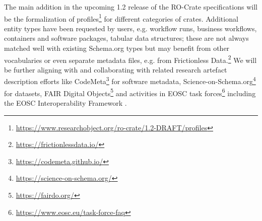 \documentclass[ds,v1.1.2,openaccess]{iosart2x}%
\begin{document}
The main addition in the upcoming 1.2 release of the RO-Crate
specifications will be the formalization of
profiles\footnote{\url{https://www.researchobject.org/ro-crate/1.2-DRAFT/profiles}}
for different categories of crates. Additional entity types have been
requested by users, e.g. workflow runs, business workflows, containers
and software packages, tabular data structures; these are not always
matched well with existing Schema.org types but may benefit from other
vocabularies or even separate metadata files, e.g. from Frictionless
Data.\footnote{\url{https://frictionlessdata.io/}} We will be further aligning with
and collaborating with related research artefact description efforts
like CodeMeta\footnote{\url{https://codemeta.github.io/}} for software metadata,
Science-on-Schema.org\footnote{\url{https://science-on-schema.org/}}
\cite{doi:10.5281/zenodo.4477164} for datasets, FAIR Digital
Objects\footnote{\url{https://fairdo.org/}} \cite{doi:10.3390/publications8020021} and
activities in EOSC task forces\footnote{\url{https://www.eosc.eu/task-force-faq}}
including the EOSC Interoperability Framework \cite{doi:10.2777/620649}.



\end{document}
